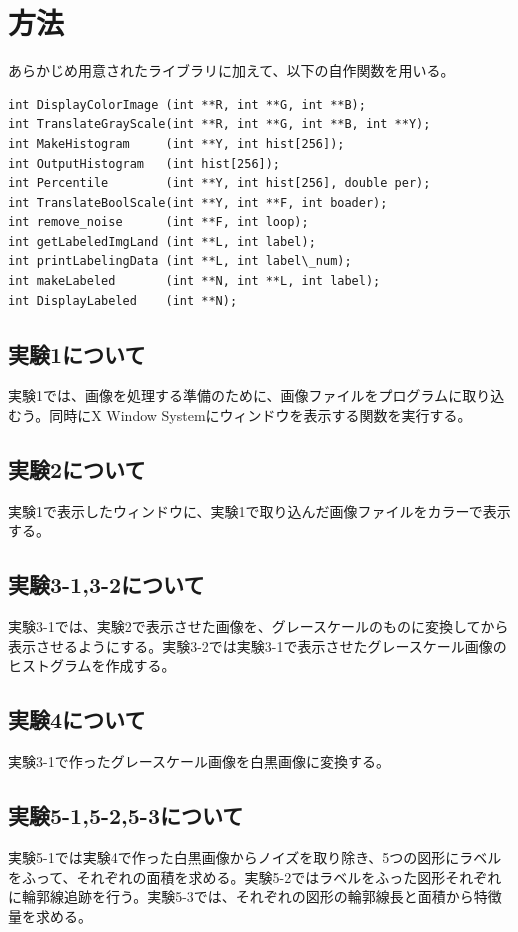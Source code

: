 \documentclass{jarticle}[2012/05/15]
\begin{document}
\section{方法}
あらかじめ用意されたライブラリに加えて、以下の自作関数を用いる。\par
{\scriptsize
\begin{lstlisting}
int DisplayColorImage (int **R, int **G, int **B);
int TranslateGrayScale(int **R, int **G, int **B, int **Y);
int MakeHistogram     (int **Y, int hist[256]);
int OutputHistogram   (int hist[256]);
int Percentile        (int **Y, int hist[256], double per);
int TranslateBoolScale(int **Y, int **F, int boader);
int remove_noise      (int **F, int loop);
int getLabeledImgLand (int **L, int label);
int printLabelingData (int **L, int label\_num);
int makeLabeled       (int **N, int **L, int label);
int DisplayLabeled    (int **N);
\end{lstlisting}
}
\subsection{実験1について}
実験1では、画像を処理する準備のために、画像ファイルをプログラムに取り込むう。同時にX Window Systemにウィンドウを表示する関数を実行する。
\subsection{実験2について}
実験1で表示したウィンドウに、実験1で取り込んだ画像ファイルをカラーで表示する。
\subsection{実験3-1,3-2について}
実験3-1では、実験2で表示させた画像を、グレースケールのものに変換してから表示させるようにする。実験3-2では実験3-1で表示させたグレースケール画像のヒストグラムを作成する。
\subsection{実験4について}
実験3-1で作ったグレースケール画像を白黒画像に変換する。
\subsection{実験5-1,5-2,5-3について}
実験5-1では実験4で作った白黒画像からノイズを取り除き、5つの図形にラベルをふって、それぞれの面積を求める。実験5-2ではラベルをふった図形それぞれに輪郭線追跡を行う。実験5-3では、それぞれの図形の輪郭線長と面積から特徴量を求める。
\end{document}
